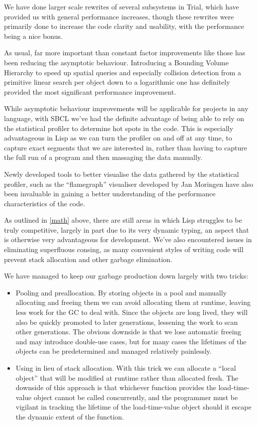 \documentclass[format=sigconf]{acmart}
\begin{document}
We have done larger scale rewrites of several subsystems in Trial, which have provided us with general performance increases, though these rewrites were primarily done to increase the code clarity and usability, with the performance being a nice bonus.

As usual, far more important than constant factor improvements like those has been reducing the asymptotic behaviour. Introducing a Bounding Volume Hierarchy to speed up spatial queries and especially collision detection from a primitive linear search per object down to a logarithmic one has definitely provided the most significant performance improvement.

While asymptotic behaviour improvements will be applicable for projects in any language, with SBCL we've had the definite advantage of being able to rely on the statistical profiler to determine hot spots in the code. This is especially advantageous in Lisp as we can turn the profiler on and off at any time, to capture exact segments that we are interested in, rather than having to capture the full run of a program and then massaging the data manually.

Newly developed tools to better visualise the data gathered by the statistical profiler, such as the ``flamegraph'' visualiser developed by Jan Moringen have also been invaluable in gaining a better understanding of the performance characteristics of the code.

As outlined in \autoref{math} above, there are still areas in which Lisp struggles to be truly competitive, largely in part due to its very dynamic typing, an aspect that is otherwise very advantageous for development. We've also encountered issues in eliminating superfluous consing, as many convenient styles of writing code will prevent stack allocation and other garbage elimination.

We have managed to keep our garbage production down largely with two tricks:

\begin{itemize}
\item Pooling and preallocation. By storing objects in a pool and manually allocating and freeing them we can avoid allocating them at runtime, leaving less work for the GC to deal with. Since the objects are long lived, they will also be quickly promoted to later generations, lessening the work to scan other generations. The obvious downside is that we lose automatic freeing and may introduce double-use cases, but for many cases the lifetimes of the objects can be predetermined and managed relatively painlessly.
\item Using  in lieu of stack allocation. With this trick we can allocate a ``local object'' that will be modified at runtime rather than allocated fresh. The downside of this approach is that whichever function provides the load-time-value object cannot be called concurrently, and the programmer must be vigilant in tracking the lifetime of the load-time-value object should it escape the dynamic extent of the function.
\end{itemize}
\end{document}
